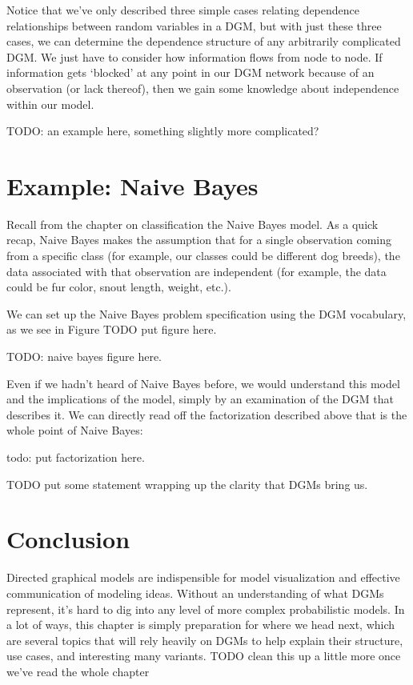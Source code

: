 Notice that we've only described three simple cases relating dependence relationships between random variables in a DGM, but with just these three cases, we can determine the dependence structure of any arbitrarily complicated DGM. We just have to consider how information flows from node to node. If information gets `blocked' at any point in our DGM network because of an observation (or lack thereof), then we gain some knowledge about independence within our model.

TODO: an example here, something slightly more complicated?


\section{Example: Naive Bayes}
Recall from the chapter on classification the Naive Bayes model. As a quick recap, Naive Bayes makes the assumption that for a single observation coming from a specific class (for example, our classes could be different dog breeds), the data associated with that observation are independent (for example, the data could be fur color, snout length, weight, etc.).

We can set up the Naive Bayes problem specification using the DGM vocabulary, as we see in Figure TODO put figure here.

TODO: naive bayes figure here.

Even if we hadn't heard of Naive Bayes before, we would understand this model and the implications of the model, simply by an examination of the DGM that describes it. We can directly read off the factorization described above that is the whole point of Naive Bayes:

todo: put factorization here.

TODO put some statement wrapping up the clarity that DGMs bring us.

\section{Conclusion}
Directed graphical models are indispensible for model visualization and effective communication of modeling ideas. Without an understanding of what DGMs represent, it's hard to dig into any level of more complex probabilistic models. In a lot of ways, this chapter is simply preparation for where we head next, which are several topics that will rely heavily on DGMs to help explain their structure, use cases, and interesting many variants. TODO clean this up a little more once we've read the whole chapter
